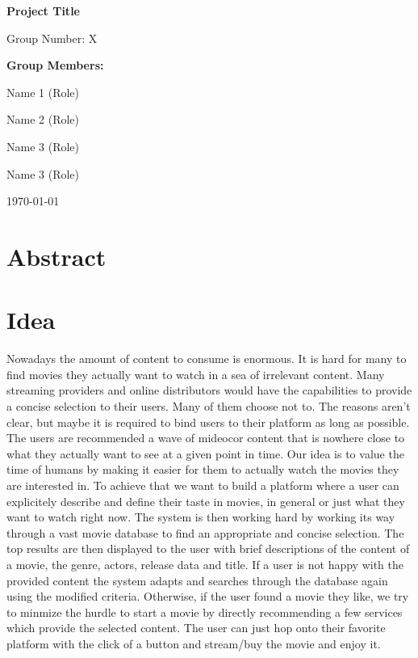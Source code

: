 \documentclass[12pt,a4paper]{article}
\begin{document}
  \begin{titlepage}
    \begin{center}
      \vspace*{2cm}
      {\huge\bfseries Project Title\par}
      \vspace{2cm}
      {\Large Group Number: X\par}
      \vspace{1.5cm}
      {\large\bfseries Group Members:\par}
      \vspace{0.5cm}
      {\large
      Name 1 (Role)\par
      Name 2 (Role)\par
      Name 3 (Role)\par
      Name 3 (Role)\par
      }
      \vfill
      {\large \today\par}
    \end{center}
  \end{titlepage}

  \tableofcontents
  \newpage

  \section{Abstract}

  \section{Idea}

  Nowadays the amount of content to consume is enormous.
  It is hard for many to find movies they actually want to watch in a sea of irrelevant content.
  Many streaming providers and online distributors would have the capabilities to provide a concise selection to their users.
  Many of them choose not to.
  The reasons aren't clear, but maybe it is required to bind users to their platform as long as possible.
  The users are recommended a wave of mideocor content that is nowhere close to what they actually want to see at a given point in time.
  Our idea is to value the time of humans by making it easier for them to actually watch the movies they are interested in.
  To achieve that we want to build a platform where a user can explicitely describe and define their taste in movies, in general or just what they want to watch right now.
  The system is then working hard by working its way through a vast movie database to find an appropriate and concise selection.
  The top results are then displayed to the user with brief descriptions of the content of a movie, the genre, actors, release data and title.
  If a user is not happy with the provided content the system adapts and searches through the database again using the modified criteria.
  Otherwise, if the user found a movie they like, we try to minmize the hurdle to start a movie by directly recommending a few services which provide the selected content.
  The user can just hop onto their favorite platform with the click of a button and stream/buy the movie and enjoy it.
\end{document}
